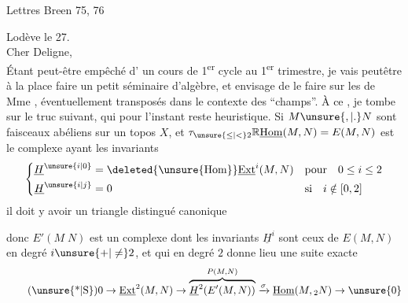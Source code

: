 
Lettres Breen 75, 76



\noindent\hfill Lodève le 27.\\
Cher Deligne,\\
Étant peut-être empêché   d' un cours de 1\textsuperscript{er} cycle au 1\textsuperscript{er} trimestre, je vais peutêtre à la place faire un petit séminaire d'algèbre, et envisage de le faire sur les  de Mme , éventuellement transposés dans le contexte des ``champs''. À ce , je tombe sur le truc suivant, qui pour l'instant reste heuristique. Si $M\unsure{,|.}N$ sont  faisceaux abéliens sur un topos $X$, et $\tau_{\unsure{\leq|<}2}\mathbb{R}\underline{\mathrm{Hom}}(M,N)=E(M,N)$ est le complexe ayant les invariants
\[
\left\{\begin{aligned}
\underline{H}^{\unsure{i|0}} &= \deleted{\unsure{\mathrm{Hom}}}\underline{\mathrm{Ext}}^{i}(M,N)  && \text{pour}\quad 0\leq i\leq 2\\
\underline{H}^{\unsure{i|j}} &= 0 && \text{si}\quad i\notin[0,2]
\end{aligned}\right.
\]
il doit y avoir un triangle distingué canonique


\margin{\mbox{-- --}}

donc $E'(M\;N)$ est un complexe dont les invariants $\underline{H}^{i}$ sont ceux de $E(M,N)$ en degré $i\unsure{+|\ne}2$, et qui en degré $2$ donne lieu  une suite exacte
\begingroup
\makeatletter\tagsleft@true\makeatother
\[
\tag*{(\unsure{*|S})}
0\to\underline{\mathrm{Ext}}^{2}(M,N)\to
\overbrace{\underline{H}^{2}\!\left(E'(M,N)\right)}^{P(M,N)}
\xrightarrow{\sigma}\underline{\mathrm{Hom}}(M,{}_{2}N)\to \unsure{0}
\]
\endgroup


